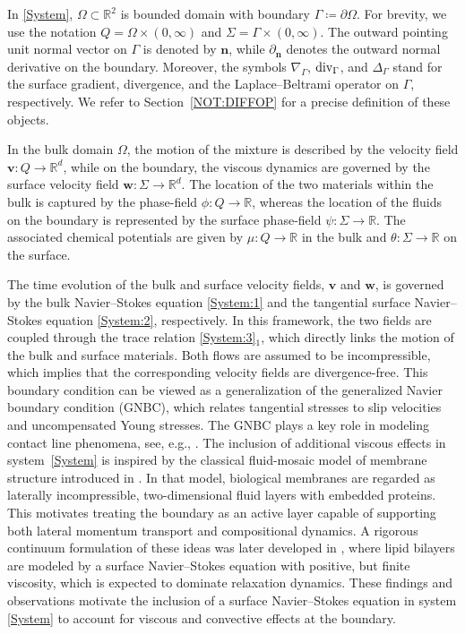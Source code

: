 \documentclass[10pt,reqno]{amsart}
\theoremstyle{remark}
\numberwithin{equation}{section}
\newcommand{\R}{\mathbb R}
\newcommand{\n}{\mathbf{n}}
\newcommand{\bv}{\mathbf{v}}
\newcommand{\bw}{\mathbf{w}}
\newcommand{\deln}{\partial_\n}
\newcommand{\Gradg}{\nabla_\Ga}
\newcommand{\Lapg}{\Delta_\Ga}
\newcommand{\Divg}{\textnormal{div}_\Ga}
\newcommand{\Om}{\Omega}
\newcommand{\Ga}{\Gamma}
\begin{document}
In \eqref{System}, $\Om\subset\R^2$ is bounded domain with boundary $\Ga\coloneqq\partial\Om$. For brevity, we use the notation $Q = \Om\times(0,\infty)$ and $\Sigma = \Ga\times(0,\infty)$. The outward pointing unit normal vector on $\Ga$ is denoted by $\n$, while $\deln$ denotes the outward normal derivative on the boundary. Moreover, the symbols $\Gradg$, $\Divg$, and $\Lapg$ stand for the surface gradient, divergence, and the Laplace--Beltrami operator on $\Ga$, respectively. We refer to Section~\ref{NOT:DIFFOP} for a precise definition of these objects.

In the bulk domain $\Om$, the motion of the mixture is described by the velocity field $\bv:Q\rightarrow\R^d$, while on the boundary, the viscous dynamics are governed by the surface velocity field $\bw:\Sigma\rightarrow\R^d$. The location of the two materials within the bulk is captured by the phase-field $\phi:Q\rightarrow\R$, whereas the location of the fluids on the boundary is represented by the surface phase-field $\psi:\Sigma\rightarrow\R$. The associated chemical potentials are given by $\mu:Q\rightarrow\R$ in the bulk and $\theta:\Sigma\rightarrow\R$ on the surface.

The time evolution of the bulk and surface velocity fields, $\bv$ and $\bw$, is governed by the bulk Navier--Stokes equation \eqref{System:1} and the tangential surface Navier--Stokes equation \eqref{System:2}, respectively. In this framework, the two fields are coupled through the trace relation \eqref{System:3}$_1$, which directly links the motion of the bulk and surface materials. Both flows are assumed to be incompressible, which implies that the corresponding velocity fields are divergence-free. This boundary condition can be viewed as a generalization of the generalized Navier boundary condition (GNBC), which relates tangential stresses to slip velocities and uncompensated Young stresses. The GNBC plays a key role in modeling contact line phenomena, see, e.g., \cite{Dussan1979, Qian2006, Seppecher1996}. The inclusion of additional viscous effects in system~\eqref{System} is inspired by the classical fluid-mosaic model of membrane structure introduced in \cite{Singer1972}.  In that model, biological membranes are regarded as laterally incompressible, two-dimensional fluid layers with embedded proteins. This motivates treating the boundary as an active layer capable of supporting both lateral momentum transport and compositional dynamics. A rigorous continuum formulation of these ideas was later developed in \cite{Arroyo2009}, where lipid bilayers are modeled by a surface Navier--Stokes equation with positive, but finite viscosity, which is expected to dominate relaxation dynamics. These findings and observations motivate the inclusion of a surface Navier--Stokes equation in system \eqref{System} to account for viscous and convective effects at the boundary. 
\end{document}
